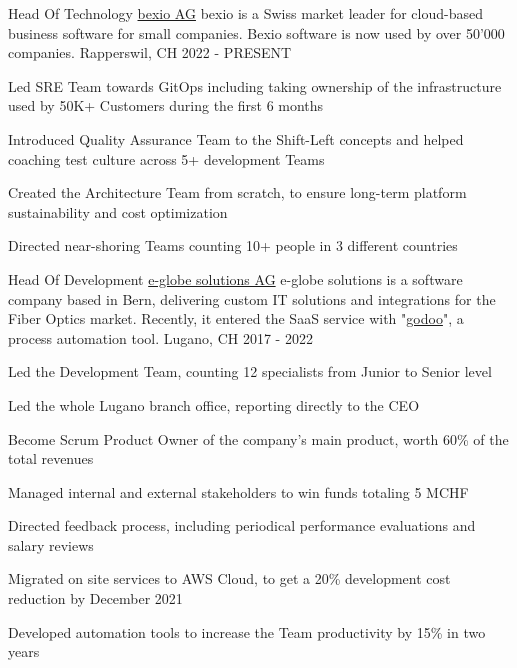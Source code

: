 
\begin{cventries}
  \cventry
    {Head Of Technology} %
    {\href{https://www.bexio.com}{bexio AG}} %
    {bexio is a Swiss market leader for cloud-based business software for small companies. Bexio software is now used by over 50'000 companies.} %
    {Rapperswil, CH} %
    {2022 - PRESENT} %
    {
      \begin{cvitems} %
      	\item {Led SRE Team towards GitOps including taking ownership of the infrastructure used by 50K+ Customers during the first 6 months}
      	\item {Introduced Quality Assurance Team to the Shift-Left concepts and helped coaching test culture across 5+ development Teams}
      	\item {Created the Architecture Team from scratch, to ensure long-term platform sustainability and cost optimization}
        \item {Directed near-shoring Teams counting 10+ people in 3 different countries}
      \end{cvitems}
    }

	\cventry
	{Head Of Development} %
	{\href{https://www.e-globe-solutions.com}{e-globe solutions AG}} %
  {e-globe solutions is a software company based in Bern, delivering custom IT solutions and integrations for the Fiber Optics market. Recently, it entered the SaaS service with "\href{https://www.godoo.ch}{godoo}", a process automation tool.} %
	{Lugano, CH} %
	{2017 - 2022} %
	{
		\begin{cvitems} %
			\item {Led the Development Team, counting 12 specialists from Junior to Senior level}
			\item {Led the whole Lugano branch office, reporting directly to the CEO}
			\item {Become Scrum Product Owner of the company's main product, worth 60\% of the total revenues}
			\item {Managed internal and external stakeholders to win funds totaling 5 MCHF}
			\item {Directed feedback process, including periodical performance evaluations and salary reviews}
			\item {Migrated on site services to AWS Cloud, to get a 20\% development cost reduction by December 2021}
			\item {Developed automation tools to increase the Team productivity by 15\% in two years}
		\end{cvitems}
	}


\end{cventries}

